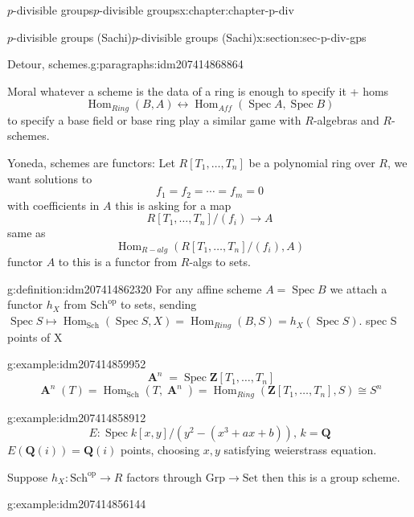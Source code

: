 \documentclass[oneside,10pt,]{book}
\numberwithin{equation}{section}
\newcommand{\lb}{[}
\newcommand{\rb}{]}
\newcommand{\ZZ}{\mathbf{Z}}
\newcommand{\QQ}{\mathbf{Q}}
\newcommand{\op}{\mathrm{op}}
\DeclareMathOperator{\Hom}{Hom}
\DeclareMathOperator{\Spec}{Spec}
\DeclareMathOperator{\aff}{\mathbf{A}}
\begin{document}
\begin{chapterptx}{\(p\)-divisible groups}{}{\(p\)-divisible groups}{}{}{x:chapter:chapter-p-div}
\begin{sectionptx}{\(p\)-divisible groups (Sachi)}{}{\(p\)-divisible groups (Sachi)}{}{}{x:section:sec-p-div-gps}
\begin{paragraphs}{Detour, schemes.}{g:paragraphs:idm207414868864}
%
\par
Moral whatever  a scheme is the data of a ring is enough to specify it + homs%
\begin{equation*}
\Hom_{Ring} (B,A) \leftrightarrow \Hom_{Aff}(\Spec A, \Spec B)
\end{equation*}
to specify a base field or base ring play a similar game with \(R\)-algebras and \(R\)-schemes.%
\par
Yoneda, schemes are functors: Let \(R\lb T_1,\ldots,T_n\rb \) be a polynomial ring over \(R\), we want solutions to%
\begin{equation*}
f_1=  f_2 = \cdots = f_m = 0
\end{equation*}
with coefficients in \(A\) this is asking for  a map%
\begin{equation*}
R\lb T_1, \ldots ,T_n] /(f_i) \to A
\end{equation*}
same as%
\begin{equation*}
\Hom_{R-alg} (R[T_1,\ldots, T_n] /(f_i), A)
\end{equation*}
functor \(A\) to this is a functor from \(R\)-algs to sets.%
\begin{definition}{}{g:definition:idm207414862320}%
For any affine scheme \(A = \Spec B\) we attach a functor \(h_X\) from \(\mathrm{Sch}^\op\) to sets, sending \(\Spec S \mapsto \Hom_{\mathrm{Sch}} (\Spec S, X) = \Hom_{Ring} (B,S) = h_X(\Spec S)\). spec S points of X%
\end{definition}
\begin{example}{}{g:example:idm207414859952}%
%
\begin{equation*}
\aff^n = \Spec \ZZ \lb T_1,\ldots, T_n\rb
\end{equation*}
%
\begin{equation*}
\aff^n(T) = \Hom_{\mathrm{Sch}} (T, \aff^n) = \Hom_{Ring}(\ZZ[T_1,\ldots, T_n], S)\cong S^n
\end{equation*}
%
\end{example}
\begin{example}{}{g:example:idm207414858912}%
%
\begin{equation*}
E \colon \Spec k[x,y] / (y^2 - (x^3 + ax +b)),\,k = \QQ
\end{equation*}
\(E(\QQ(i)) = \QQ(i)\) points, choosing \(x,y\) satisfying weierstrass equation.%
\end{example}
Suppose \(h_X \colon \mathrm{Sch}^\op \to R\) factors through \(\mathrm{Grp} \to \mathrm{Set}\) then this is a group scheme.%
\begin{example}{}{g:example:idm207414856144}%

\end{example}
\end{paragraphs}
\end{sectionptx}
\end{chapterptx}
\end{document}
